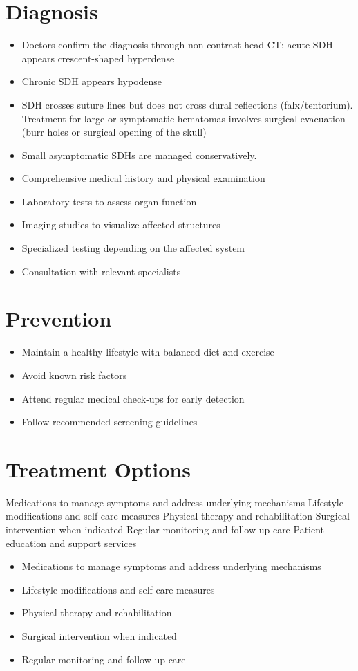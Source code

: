 \section{Diagnosis}
\begin{itemize}[noitemsep]
  \item Doctors confirm the diagnosis through non-contrast head CT: acute SDH appears crescent-shaped hyperdense
  \item Chronic SDH appears hypodense
  \item SDH crosses suture lines but does not cross dural reflections (falx/tentorium). Treatment for large or symptomatic hematomas involves surgical evacuation (burr holes or surgical opening of the skull)
  \item Small asymptomatic SDHs are managed conservatively.
  \item Comprehensive medical history and physical examination
  \item Laboratory tests to assess organ function
  \item Imaging studies to visualize affected structures
  \item Specialized testing depending on the affected system
  \item Consultation with relevant specialists
\end{itemize}
\section{Prevention}
\begin{itemize}[noitemsep]
  \item Maintain a healthy lifestyle with balanced diet and exercise
  \item Avoid known risk factors
  \item Attend regular medical check-ups for early detection
  \item Follow recommended screening guidelines
\end{itemize}
\section{Treatment Options}
Medications to manage symptoms and address underlying mechanisms Lifestyle modifications and self-care measures Physical therapy and rehabilitation Surgical intervention when indicated Regular monitoring and follow-up care Patient education and support services

\begin{itemize}[noitemsep]
  \item Medications to manage symptoms and address underlying mechanisms
  \item Lifestyle modifications and self-care measures
  \item Physical therapy and rehabilitation
  \item Surgical intervention when indicated
  \item Regular monitoring and follow-up care
\end{itemize}
